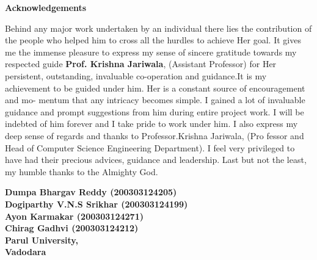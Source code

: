 \thispagestyle{empty}
\newpage
\cleardoublepage{}
{}
\begin{center}
{\Large \bf Acknowledgements}\\
\end{center}
\vspace{10pt}
\begin{flushright}
\end{flushright}


Behind any major work undertaken by an individual there lies the contribution of the people
who helped him to cross all the hurdles to achieve Her goal. It gives me the immense pleasure to
express my sense of sincere gratitude towards my respected guide \textbf{Prof. Krishna Jariwala},
(Assistant Professor) for Her persistent, outstanding, invaluable co-operation and guidance.It is my
achievement to be guided under him. Her is a constant source of encouragement and mo- mentum
that any intricacy becomes simple. I gained a lot of invaluable guidance and prompt suggestions
from him during entire project work. I will be indebted of him forever and I take pride to work
under him. I also express my deep sense of regards and thanks to Professor.Krishna Jariwala, (Pro
fessor and Head of Computer Science Engineering Department). I feel very privileged to have had
their precious advices, guidance and leadership. Last but not the least, my humble thanks to the
Almighty God.


\vspace{1.5cm}
\begin{flushright}
\textbf{Dumpa Bhargav Reddy (200303124205) \\ Dogiparthy V.N.S Srikhar (200303124199) \\ Ayon Karmakar (200303124271) \\ Chirag Gadhvi (200303124212) \\ Parul University, \\ Vadodara}\\ 
\end{flushright}